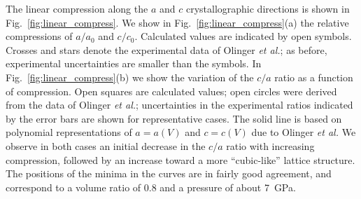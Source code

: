 \documentclass[prb,aps,nobibnotes,twocolumn,doublespace,twocolumngrid,superbib]{revtex4}
\begin{document}
The linear compression along the $a$ and $c$ crystallographic
directions is shown in Fig.~\ref{fig:linear_compress}.  We show in
Fig.~\ref{fig:linear_compress}(a) the relative compressions of $a/a_0$
and $c/c_0$.  Calculated values are indicated by open symbols.
Crosses and stars denote the experimental data of Olinger {\it et
al.};\cite{Olinger_1975v62} as before, experimental uncertainties are
smaller than the symbols.  In Fig.~\ref{fig:linear_compress}(b) we
show the variation of the $c/a$ ratio as a function of compression.
Open squares are calculated values; open circles were derived from the
data of Olinger {\it et al.};\cite{Olinger_1975v62} uncertainties in
the experimental ratios indicated by the error bars are shown for
representative cases.  The solid line is based on polynomial
representations of $a=a(V)$ and $c=c(V)$ due to Olinger {\it et
al.}\cite{Olinger_1975v62} We observe in both cases an initial
decrease in the $c/a$ ratio with increasing compression, followed by
an increase toward a more ``cubic-like'' lattice structure.  The
positions of the minima in the curves are in fairly good agreement,
and correspond to a volume ratio of 0.8 and a pressure of about 7~GPa.
\end{document}
